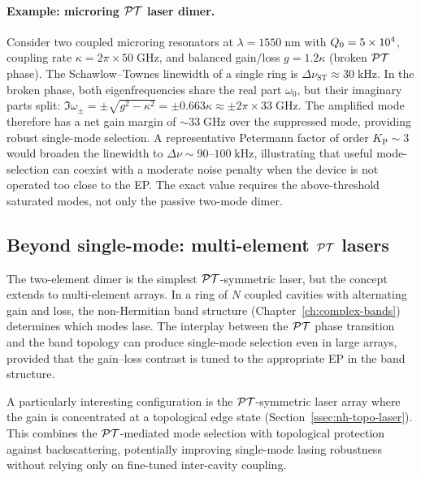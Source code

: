 \paragraph{Example: microring $\mathcal{PT}$ laser dimer.}
Consider two coupled microring resonators at $\lambda = 1550\;\mathrm{nm}$
with $Q_0 = 5 \times 10^4$, coupling rate
$\kappa = 2\pi \times 50\;\mathrm{GHz}$, and balanced gain/loss
$g = 1.2\kappa$ (broken $\mathcal{PT}$ phase).  The Schawlow--Townes linewidth
of a single ring is
$\Delta\nu_{\mathrm{ST}} \approx 30\;\mathrm{kHz}$.  In the broken
phase, both eigenfrequencies share the real part $\omega_0$, but their
imaginary parts split:
$\Im\omega_\pm = \pm\sqrt{g^2 - \kappa^2} = \pm 0.663\kappa
\approx \pm 2\pi \times 33\;\mathrm{GHz}$.
The amplified mode therefore has a net gain margin of
$\sim 33\;\mathrm{GHz}$ over the suppressed mode, providing robust
single-mode selection.  A representative Petermann factor of order
$K_{\mathrm{P}}\sim3$ would broaden the linewidth to
$\Delta\nu \sim 90$--$100\;\mathrm{kHz}$, illustrating that useful
mode-selection can coexist with a moderate noise penalty when the device
is not operated too close to the EP. The exact value requires the
above-threshold saturated modes, not only the passive two-mode dimer.

\subsection{Beyond single-mode: multi-element $\mathcal{PT}$ lasers}
\label{ssec:pt-multi}

The two-element dimer is the simplest $\mathcal{PT}$-symmetric laser, but the
concept extends to multi-element arrays. In a ring of $N$ coupled
cavities with alternating gain and loss, the non-Hermitian band
structure (Chapter~\ref{ch:complex-bands}) determines which modes lase.
The interplay between the $\mathcal{PT}$ phase transition and the band topology
can produce single-mode selection even in large arrays, provided that
the gain--loss contrast is tuned to the appropriate EP in the band
structure.

A particularly interesting configuration is the $\mathcal{PT}$-symmetric
laser array where the gain is concentrated at a topological edge state
(Section~\ref{ssec:nh-topo-laser}). This combines the $\mathcal{PT}$-mediated
mode selection with topological protection against backscattering,
potentially improving single-mode lasing robustness without relying only
on fine-tuned inter-cavity coupling.


